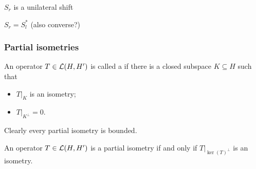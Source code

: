 \begin{lemma}
$S_r$ is a unilateral shift
\end{lemma}

\begin{proposition}
$S_r = S^*_l$ (also converse?)
\end{proposition}

\subsubsection{Partial isometries}
\begin{definition}
An operator $T\in \operatorname{\mathcal{L}}(H, H')$ is called a  if there is a closed subspace $K\subseteq H$ such that
\begin{itemize}
\item $T|_K$ is an isometry;
\item $T|_{K^\perp} = 0$.
\end{itemize}
\end{definition}

Clearly every partial isometry is bounded.

\begin{lemma}
An operator $T\in \operatorname{\mathcal{L}}(H, H')$ is a partial isometry \textup{if and only if} $T|_{\ker(T)^\perp}$ is an isometry.
\end{lemma}

